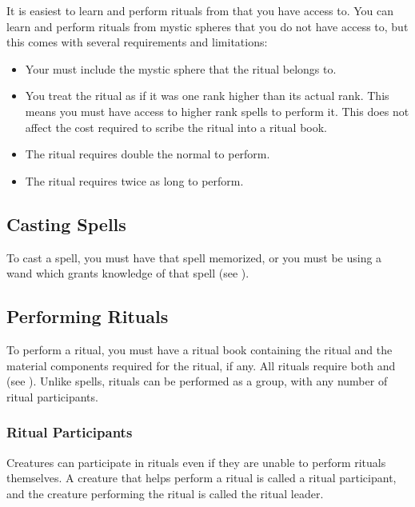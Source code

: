     It is easiest to learn and perform rituals from  that you have access to.
    You can learn and perform rituals from mystic spheres that you do not have access to, but this comes with several requirements and limitations:
    \begin{itemize}
      \item Your  must include the mystic sphere that the ritual belongs to.
      \item You treat the ritual as if it was one rank higher than its actual rank.
        This means you must have access to higher rank spells to perform it.
        This does not affect the cost required to scribe the ritual into a ritual book.
      \item The ritual requires double the normal  to perform.
      \item The ritual requires twice as long to perform.
    \end{itemize}

  \subsection{Casting Spells}
    To cast a spell, you must have that spell memorized, or you must be using a wand which grants knowledge of that spell (see ).

  \subsection{Performing Rituals}\label{Performing Rituals}
    To perform a ritual, you must have a ritual book containing the ritual and the material components required for the ritual, if any.
    All rituals require both  and  (see ).
    Unlike spells, rituals can be performed as a group, with any number of ritual participants.

    \subsubsection{Ritual Participants}
      Creatures can participate in rituals even if they are unable to perform rituals themselves.
      A creature that helps perform a ritual is called a ritual participant, and the creature performing the ritual is called the ritual leader.

